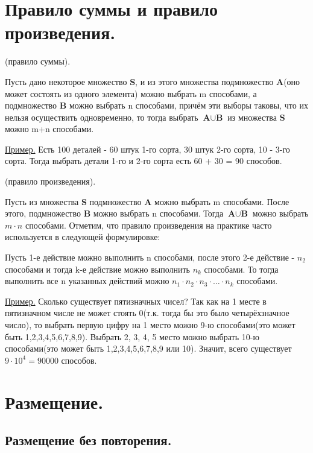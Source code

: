 \documentclass[12pt, a4paper]{article}
\begin{document}
\section{Правило суммы и правило произведения.}


(правило суммы).\par
Пусть дано некоторое множество \textbf{S}, и из этого множества подмножество \textbf{A}(оно может состоять из одного элемента) можно выбрать m способами, а подмножество \textbf{B} можно выбрать n способами, причём эти выборы таковы, что их нельзя осуществить одновременно, то тогда выбрать $\textbf{A} \cup \textbf{B}$ из множества \textbf{S} можно m+n способами.\par 

\underline{Пример.} Есть 100 деталей - 60 штук 1-го сорта, 30 штук 2-го сорта, 10 - 3-го сорта. Тогда выбрать детали 1-го и 2-го сорта есть 60 + 30 = 90 способов.

(правило произведения). \par 
Пусть из множества \textbf{S} подмножество \textbf{A} можно выбрать m способами. После этого, подмножество \textbf{B} можно выбрать n способами. Тогда $\textbf{A} \cup \textbf{B}$ можно выбрать $m \cdot n$ способами. Отметим, что правило произведения на практике часто используется в следующей формулировке: \par 

Пусть 1-е действие можно выполнить n способами, после этого 2-е действие - $n_2$ способами и тогда k-е действие можно выполнить $n_k$ способами. То тогда выполнить все n указанных действий можно $n_1 \cdot n_2 \cdot n_3 \cdot \dots \cdot n_k$ способами. \par 

\underline{Пример.} Сколько существует пятизначных чисел? 
Так как на 1 месте в пятизначном числе не может стоять 0(т.к. тогда бы это было четырёхзначное число), то выбрать первую цифру на 1 место можно 9-ю способами(это может быть 1,2,3,4,5,6,7,8,9). Выбрать 2, 3, 4, 5 место можно выбрать 10-ю способами(это может быть 1,2,3,4,5,6,7,8,9 или 10). Значит, всего существует $9 \cdot 10^4 = 90000$ способов.


\section{Размещение.}


\subsection{Размещение без повторения.}
\end{document}
